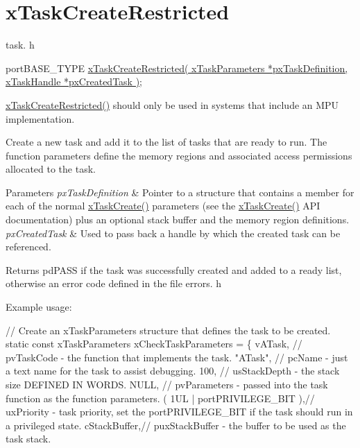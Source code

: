 \hypertarget{group__xTaskCreateRestricted}{}\section{x\+Task\+Create\+Restricted}
\label{group__xTaskCreateRestricted}
task. h 
\begin{DoxyPre}
 portBASE\_TYPE \hyperlink{task_8h_a61b00cd623953f4f94fe794057d7f648}{xTaskCreateRestricted( xTaskParameters *pxTaskDefinition, xTaskHandle *pxCreatedTask )};\end{DoxyPre}


\hyperlink{task_8h_a61b00cd623953f4f94fe794057d7f648}{x\+Task\+Create\+Restricted()} should only be used in systems that include an M\+PU implementation.

Create a new task and add it to the list of tasks that are ready to run. The function parameters define the memory regions and associated access permissions allocated to the task.


\begin{DoxyParams}{Parameters}
{\em px\+Task\+Definition} & Pointer to a structure that contains a member for each of the normal \hyperlink{task_8h_adf67e7cd0bfd1eda9e8afd048206f7c2}{x\+Task\+Create()} parameters (see the \hyperlink{task_8h_adf67e7cd0bfd1eda9e8afd048206f7c2}{x\+Task\+Create()} A\+PI documentation) plus an optional stack buffer and the memory region definitions.\\
\hline
{\em px\+Created\+Task} & Used to pass back a handle by which the created task can be referenced.\\
\hline
\end{DoxyParams}
\begin{DoxyReturn}{Returns}
pd\+P\+A\+SS if the task was successfully created and added to a ready list, otherwise an error code defined in the file errors. h
\end{DoxyReturn}
Example usage\+: 
\begin{DoxyPre}
// Create an xTaskParameters structure that defines the task to be created.
static const xTaskParameters xCheckTaskParameters =
\{
    vATask,     // pvTaskCode - the function that implements the task.
    "ATask",    // pcName - just a text name for the task to assist debugging.
    100,        // usStackDepth - the stack size DEFINED IN WORDS.
    NULL,       // pvParameters - passed into the task function as the function parameters.
    ( 1UL | portPRIVILEGE\_BIT ),// uxPriority - task priority, set the portPRIVILEGE\_BIT if the task should run in a privileged state.
    cStackBuffer,// puxStackBuffer - the buffer to be used as the task stack.\end{DoxyPre}




